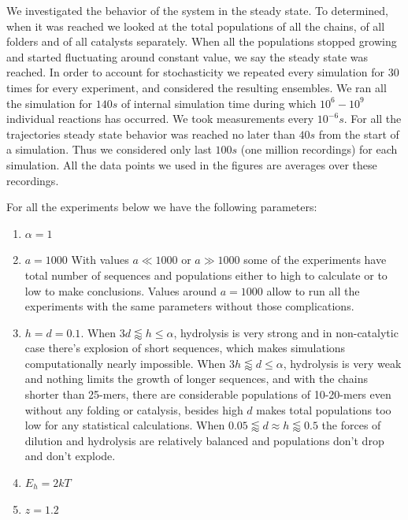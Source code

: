 \documentclass[journal=jacsat,manuscript=article,layout=twocolumn]{achemso}
\newcommand*{\ga}{\alpha}
\begin{document}
We investigated the behavior of the system in the steady state. To determined, when it was reached 
we looked at the total populations of all the chains, of all folders and of all catalysts 
separately. When all the populations stopped growing and started fluctuating around constant value, 
we say the steady state was reached. In order 
to account for stochasticity we repeated every simulation for 30 times for every experiment, and 
considered the resulting ensembles. We ran all the simulation for $140s$ of internal simulation 
time 
during which $10^6-10^9$ individual reactions has occurred. We took measurements every $10^{-6}s.$ 
For all the trajectories steady state behavior was reached no later than $40s$ from the start of 
a simulation. Thus we considered only last $100s$ (one million recordings) for each simulation. All 
the data points we used in the figures are averages over these recordings.


For all the experiments below we have the following parameters:
\begin{enumerate}
 \item $\ga = 1$
 \item $a=1000$
 \subitem With values $a\ll 1000\,\,\mbox{or}\,\,a\gg1000$ some of the experiments have total 
number of sequences and populations either to high to calculate or to low to make conclusions. 
Values around $a=1000$ allow to run all the experiments with the same parameters without those 
complications.
 \item $h=d=0.1$.
 \subitem When $3d\lessapprox h\leq\ga$, hydrolysis is very strong and in 
non-catalytic case there's explosion of short sequences, which makes simulations computationally 
nearly impossible. 
\subitem When $3h\lessapprox d\leq\ga$, hydrolysis is very weak and nothing limits the 
growth of longer sequences, and with the chains shorter than 25-mers, there are considerable 
populations of 10-20-mers even without any folding or catalysis, besides high $d$ makes total 
populations too low for any statistical calculations. 
\subitem When $0.05\lessapprox d\approx h \lessapprox 0.5$ the forces of dilution and hydrolysis 
are relatively balanced and populations don't drop and don't explode.
 \item $E_h = 2kT$
 \item $z=1.2$
\end{enumerate}
\end{document}

